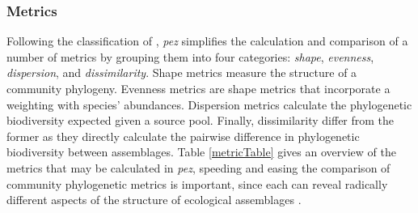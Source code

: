 \documentclass[11pt]{article} %
\begin{document}
\subsubsection*{Metrics}
Following the classification of \textcite{Pearse2014review},
\emph{pez} simplifies the calculation and comparison of a number of
metrics by grouping them into four categories: \emph{shape},
\emph{evenness}, \emph{dispersion}, and \emph{dissimilarity}. Shape metrics measure the structure of a community phylogeny. Evenness metrics are shape metrics that incorporate a weighting with species’ abundances. Dispersion metrics
calculate the phylogenetic biodiversity expected given a source pool. Finally, dissimilarity differ from the former as they directly calculate the pairwise difference in 
phylogenetic biodiversity between assemblages. 
Table \ref{metricTable}
gives an overview of the metrics that may be calculated in \emph{pez}, speeding and easing
the comparison of community phylogenetic metrics is important, since
each can reveal radically different aspects of the structure of
ecological assemblages \autocite{Cadotte2010}.
\end{document}
